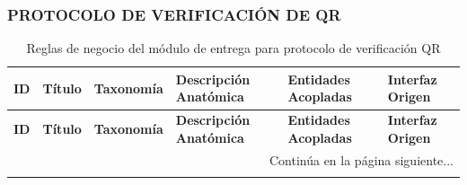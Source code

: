 \begin{landscape}
\subsubsection{PROTOCOLO DE VERIFICACIÓN DE QR}
\begingroup
\setlength{\LTleft}{\fill}
\setlength{\LTright}{\fill}

\begin{longtable}[c]{l p{2.1cm} p{2.1cm} p{8cm} p{4cm} p{3cm}}
\caption{Reglas de negocio del módulo de entrega para protocolo de verificación QR} \label{tab:reglas-negocio-entrega-verificacion-qr}\\
\toprule
\textbf{ID} & \textbf{Título} & \textbf{Taxonomía} & \textbf{Descripción Anatómica} & \textbf{Entidades Acopladas} & \textbf{Interfaz Origen} \\
\midrule
\endfirsthead

\toprule
\textbf{ID} & \textbf{Título} & \textbf{Taxonomía} & \textbf{Descripción Anatómica} & \textbf{Entidades Acopladas} & \textbf{Interfaz Origen} \\
\midrule
\endhead

\midrule
\multicolumn{6}{r}{\small Continúa en la página siguiente...} \\
\endfoot
\bottomrule
\endlastfoot


\end{longtable}
\end{landscape}
